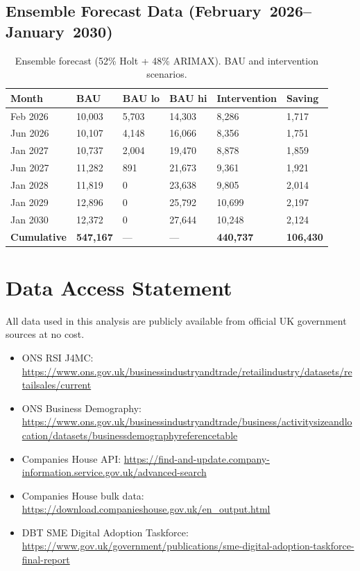 \documentclass[12pt,a4paper]{article}
\begin{document}
\subsection{Ensemble Forecast Data (February~2026--January~2030)}

\begin{table}[H]
\centering
\caption{Ensemble forecast (52\% Holt + 48\% ARIMAX). BAU and intervention scenarios.}
\small{}
\begin{tabular}{@{}L{2.0cm}R{2.0cm}R{2.0cm}R{2.0cm}R{2.0cm}R{2.5cm}@{}}
\toprule
{}\color{white}\textbf{Month} &
\color{white}\textbf{BAU} & \color{white}\textbf{BAU lo} &
\color{white}\textbf{BAU hi} & \color{white}\textbf{Intervention} &
\color{white}\textbf{Saving} \\
\midrule
Feb 2026 & 10,003 & 5,703 & 14,303 & 8,286 & 1,717 \\
Jun 2026 & 10,107 & 4,148 & 16,066 & 8,356 & 1,751 \\
Jan 2027 & 10,737 & 2,004 & 19,470 & 8,878 & 1,859 \\
Jun 2027 & 11,282 & 891 & 21,673 & 9,361 & 1,921 \\
Jan 2028 & 11,819 & 0 & 23,638 & 9,805 & 2,014 \\
Jan 2029 & 12,896 & 0 & 25,792 & 10,699 & 2,197 \\
Jan 2030 & 12,372 & 0 & 27,644 & 10,248 & 2,124 \\
\midrule
\textbf{Cumulative} & \textbf{547,167} & --- & --- & \textbf{440,737} & \textbf{106,430} \\
\bottomrule
\end{tabular}
\end{table}

\section{Data Access Statement}
\label{app:data}

All data used in this analysis are publicly available from official UK government sources
at no cost.

\begin{sloppypar}
\begin{itemize}[leftmargin=*]
\item ONS RSI J4MC: \url{https://www.ons.gov.uk/businessindustryandtrade/retailindustry/datasets/retailsales/current}
\item ONS Business Demography: \url{https://www.ons.gov.uk/businessindustryandtrade/business/activitysizeandlocation/datasets/businessdemographyreferencetable}
\item Companies House API: \url{https://find-and-update.company-information.service.gov.uk/advanced-search}
\item Companies House bulk data: \url{https://download.companieshouse.gov.uk/en_output.html}
\item DBT SME Digital Adoption Taskforce: \url{https://www.gov.uk/government/publications/sme-digital-adoption-taskforce-final-report}
\end{itemize}
\end{sloppypar}
\end{document}
